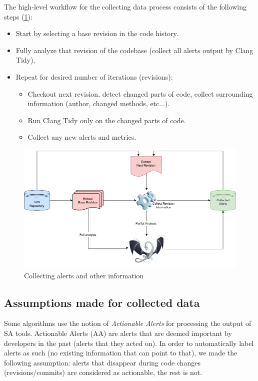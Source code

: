 The high-level workflow for the collecting data process consists of the following steps (\cref{data_workflow}):
\begin{itemize}
	\item Start by selecting a base revision in the code history.
	\item Fully analyze that revision of the codebase (collect all alerts output by Clang Tidy).
	\item Repeat for desired number of iterations (revisions):
	\begin{itemize}
		\item Checkout next revision, detect changed parts of code, collect surrounding information (author, changed methods, etc...).
		\item Run Clang Tidy only on the changed parts of code.
		\item Collect any new alerts and metrics.
	\end{itemize} 
\end{itemize}


\begin{figure}[H]
	\centering
	\includegraphics[scale=0.25]{./src/collect_info.png}
	\caption{Collecting alerts and other information}
	\label{data_workflow}
\end{figure}

\subsection{Assumptions made for collected data}
\label{data_assumptions}

Some algorithms use the notion of \textit{Actionable Alerts} for processing the output of SA tools. Actionable Alerts (AA) are alerts that are deemed important by developers in the past (alerts that they acted on). In order to automatically label alerts as such (no existing information that can point to that), we made the following assumption: alerts that disappear during code changes (revisions/commits) are considered as actionable, the rest is not.

